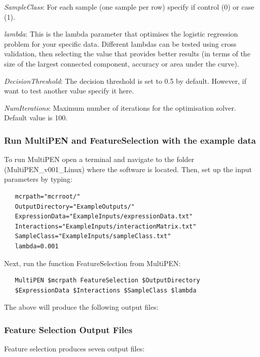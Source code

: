 \documentclass[11pt, oneside]{article}   	%
\begin{document}
{\it SampleClass}: For each sample (one sample per row) specify if control (0) or case (1).

{\it lambda}: This is the lambda parameter that optimises the logistic regression problem for your specific data. Different lambdas can be tested using cross validation, then selecting the value that provides better results (in terms of the size of the largest connected component, accuracy or area under the curve).  

{\it DecisionThreshold}: The decision threshold is set to 0.5 by default. However, if want to test another value specify it here.

{\it NumIterations}: Maximum number of iterations for the optimisation solver. Default value is 100.


\subsubsection{Run MultiPEN and FeatureSelection with the example data}


To run MultiPEN open a terminal and navigate to the folder (MultiPEN\_v001\_Linux) where the software is located. Then, set up the input parameters by typing:

\begin{framed}
\begin{verbatim}
   mcrpath="mcrroot/" 
   OutputDirectory="ExampleOutputs/"
   ExpressionData="ExampleInputs/expressionData.txt"
   Interactions="ExampleInputs/interactionMatrix.txt"
   SampleClass="ExampleInputs/sampleClass.txt"
   lambda=0.001
\end{verbatim}
\end{framed}


Next, run the function FeatureSelection from MultiPEN:

\begin{framed}
\begin{verbatim}
   MultiPEN $mcrpath FeatureSelection $OutputDirectory
   $ExpressionData $Interactions $SampleClass $lambda
\end{verbatim}
\end{framed}


The above will produce the following output files:

\subsubsection{Feature Selection Output Files}


Feature selection produces seven output files: 
\end{document}
